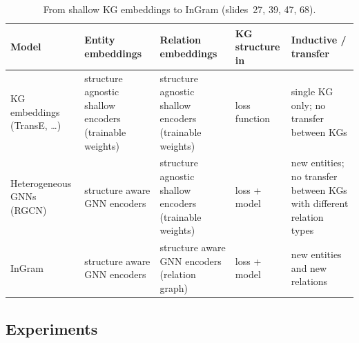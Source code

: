 \begin{table}[htbp]
  \centering\small
  \caption{From shallow KG embeddings to InGram (slides~27, 39, 47, 68).}
  \label{tab:lec15-compare}
  \renewcommand{\arraystretch}{1.2}
  \begin{tabularx}{\textwidth}{@{}>{\raggedright\arraybackslash}p{2.3cm}>{\raggedright\arraybackslash}X>{\raggedright\arraybackslash}X>{\raggedright\arraybackslash}p{2.2cm}>{\raggedright\arraybackslash}X@{}}
    \toprule
    Model & Entity embeddings & Relation embeddings & KG structure in & Inductive / transfer\\
    \midrule
    KG embeddings (TransE, \dots) & structure agnostic shallow encoders (trainable
      weights) & structure agnostic shallow encoders (trainable weights) & loss function
      & single KG only; no transfer between KGs\\
    Heterogeneous GNNs (RGCN) & structure aware GNN encoders & structure agnostic
      shallow encoders (trainable weights) & loss + model & new entities; no transfer
      between KGs with different relation types\\
    InGram & structure aware GNN encoders & structure aware GNN encoders (relation
      graph) & loss + model & new entities and new relations\\
    \bottomrule
  \end{tabularx}
\end{table}

\subsection{Experiments}\label{sec:lec15-exp}

